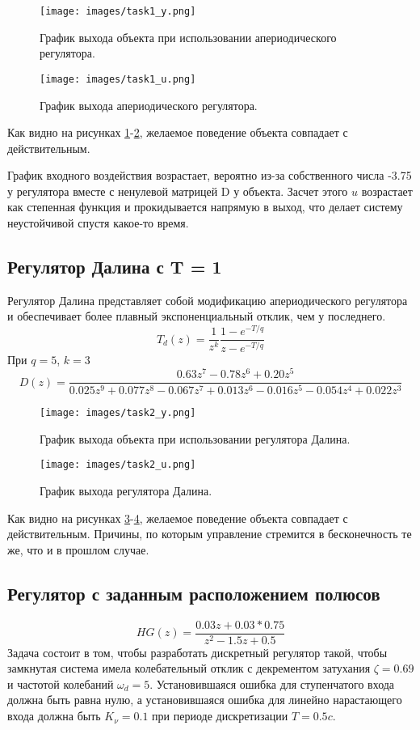 \documentclass[a4paper, 14pt]{extarticle}
\theoremstyle{definition}
\theoremstyle{plain}
\theoremstyle{remark}
\begin{document}
\begin{figure}
	[H]
	\centering
	\texttt{[image: images/task1\_y.png]}
	\caption{График выхода объекта при использовании апериодического регулятора.}
	\label{fig:task1_y}
\end{figure}
\begin{figure}
	[H]
	\centering
	\texttt{[image: images/task1\_u.png]}
	\caption{График выхода апериодического регулятора.}
	\label{fig:task1_u}
\end{figure}
Как видно на рисунках \ref{fig:task1_y}-\ref{fig:task1_u}, желаемое поведение объекта совпадает с действительным. 

График входного воздействия возрастает, вероятно из-за собственного числа -3.75 у регулятора вместе с ненулевой матрицей D у объекта. Засчет этого \(u\) возрастает как степенная функция и прокидывается напрямую в выход, что делает систему неустойчивой спустя какое-то время.
\subsection{Регулятор Далина с T = 1}
Регулятор Далина представляет собой модификацию апериодического регулятора и обеспечивает более плавный экспоненциальный отклик, чем у последнего. 
\[T_d(z) = \frac{1}{z^k} \frac{1 - e^{-T/q}}{z - e^{-T/q}}\]
При \(q = 5\), \(k=3\)
\[D(z)= \frac{0.63 z^7 - 0.78 z^6 + 0.20 z^5}{0.025 z^9 + 0.077 z^8 - 0.067 z^7 + 0.013 z^6 - 0.016 z^5 - 0.054 z^4 + 0.022 z^3}\]

\begin{figure}
	[H]
	\centering
	\texttt{[image: images/task2\_y.png]}
	\caption{График выхода объекта при использовании регулятора Далина.}
	\label{fig:task2_y}
\end{figure}
\begin{figure}
	[H]
	\centering
	\texttt{[image: images/task2\_u.png]}
	\caption{График выхода регулятора Далина.}
	\label{fig:task2_u}
\end{figure}
Как видно на рисунках \ref{fig:task2_y}-\ref{fig:task2_u}, желаемое поведение объекта совпадает с действительным. 
Причины, по которым управление стремится в бесконечность те же, что и в прошлом случае.

\subsection{Регулятор с заданным расположением полюсов}
\[HG(z) = \frac{0.03z + 0.03*0.75}{z^2 - 1.5z + 0.5}\]
Задача состоит в том, чтобы разработать дискретный регулятор такой, чтобы замкнутая система имела колебательный отклик с декрементом затухания \(\zeta = 0.69\) и частотой колебаний \(\omega_d = 5\). 
Установившаяся ошибка для ступенчатого входа должна быть равна нулю, а установившаяся ошибка для линейно
нарастающего входа должна быть \(K_\nu  = 0.1\) при периоде дискретизации \(T = 0.5c\). 
\end{document}
